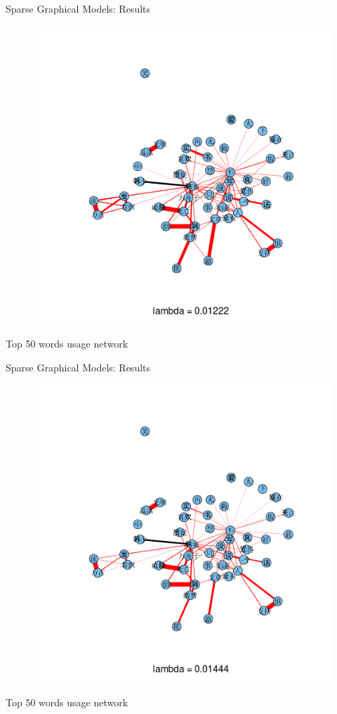 \documentclass[12pt]{beamer}
\newcommand{\1}[1]{{\mathbf 1}\left\{#1\right\}}        %
\begin{document}
\begin{frame}{Sparse Graphical Models: Results}

\begin{figure}
  \centering
  \includegraphics[height=0.9\textheight]{./../../gLassoResults/glasso2.png} 
\end{figure}
\center Top 50 words usage network

\end{frame}
\begin{frame}{Sparse Graphical Models: Results}

\begin{figure}
  \centering
  \includegraphics[height=0.9\textheight]{./../../gLassoResults/glasso3.png} 
\end{figure}
\center Top 50 words usage network

\end{frame}
\end{document}
